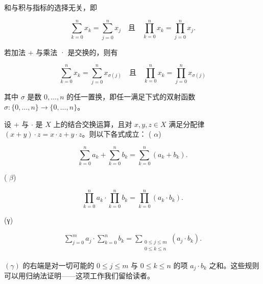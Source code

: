 \begin{remark}

\begin{items}
\item

和与积与指标的选择无关，即

\[
\sum_{k=0}^{n}x_{k}=\sum_{j=0}^{n}x_{j}\quad\text{且}\quad\prod_{k=0}^{n}x_{k}=\prod_{j=0}^{n}x_{j}.
\]

若加法 + 与乘法 · 是交换的，则有

\[
\sum_{k=0}^{n}x_{k}=\sum_{j=0}^{n}x_{\sigma(j)}\quad\text{且}\quad\prod_{k=0}^{n}x_{k}=\prod_{j=0}^{n}x_{\sigma(j)}
\]

其中 $ \sigma $ 是数 $ 0, \ldots, n $ 的任一置换，即任一满足下式的双射函数 $ \sigma: \{0, \ldots, n\} \to \{0, \ldots, n\} $。

\item

设 + 与 $ \cdot $ 是 $ X $ 上的结合交换运算，且对 $ x, y, z \in X $ 满足分配律 $ (x + y) \cdot z = x \cdot z + y \cdot z $。则以下各式成立：
( $ \alpha $)

\[
\sum_{k=0}^{n}a_{k}+\sum_{k=0}^{n}b_{k}=\sum_{k=0}^{n}(a_{k}+b_{k}).
\]

( $ \beta $)

\[
\prod_{k=0}^{n}a_{k}\cdot\prod_{k=0}^{n}b_{k}=\prod_{k=0}^{n}(a_{k}\cdot b_{k}).
\]

(γ)

\begin{equation*}
\begin{aligned}
\sum_{j=0}^{m}a_{j}\cdot\sum_{k=0}^{n}b_{k}=\sum_{\substack{0\leq j\leq m\\ 0\leq k\leq n}}(a_{j}\cdot b_{k}).
\end{aligned}
\end{equation*}

$(\gamma)$ 的右端是对一切可能的 $0 \leq j \leq m$ 与 $0 \leq k \leq n$ 的项 $a_j \cdot b_k$ 之和。这些规则可以用归纳法证明——这项工作我们留给读者。

\end{items}

\end{remark}

